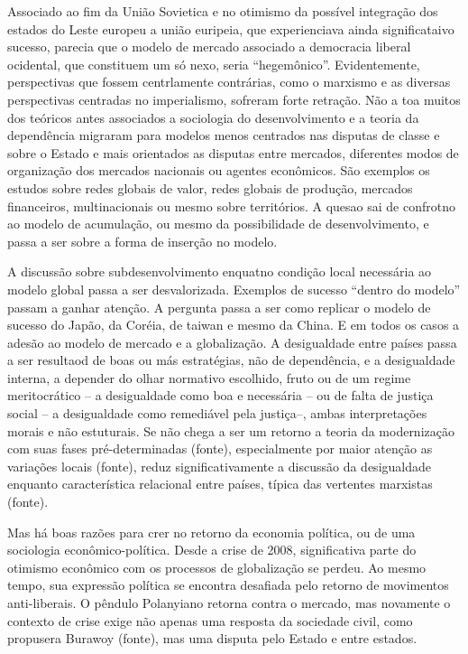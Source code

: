 Associado ao fim da União Sovietica e no otimismo da possível integração dos estados do Leste europeu a união euripeia, que experienciava ainda significataivo sucesso, parecia que o modelo de mercado associado a democracia liberal ocidental, que constituem um só nexo, seria ``hegemônico''. Evidentemente, perspectivas que fossem centrlamente contrárias, como o marxismo e as diversas perspectivas centradas no imperialismo, sofreram forte retração. Não a toa muitos dos teóricos antes associados a sociologia do desenvolvimento e a teoria da dependência migraram para modelos menos centrados nas disputas de classe e sobre o Estado e mais orientados as disputas entre mercados, diferentes modos de organização dos mercados nacionais ou agentes econômicos. São exemplos os estudos sobre redes globais de valor, redes globais de produção, mercados financeiros, multinacionais ou mesmo sobre territórios. A quesao sai de confrotno ao modelo de acumulação, ou mesmo da possibilidade de desenvolvimento, e passa a ser sobre a forma de inserção no modelo.

A discussão sobre subdesenvolvimento enquatno condição local necessária ao modelo global passa a ser desvalorizada. Exemplos de sucesso ``dentro do modelo'' passam a ganhar atenção. A pergunta passa a ser como replicar o modelo de sucesso do Japão, da Coréia, de taiwan e mesmo da China. E em todos os casos a adesão ao modelo de mercado e a globalização. A desigualdade entre países passa a ser resultaod de boas ou más estratégias, não de dependência, e a desigualdade interna, a depender do olhar normativo escolhido, fruto ou de um regime meritocrático -- a desigualdade como boa e necessária -- ou de falta de justiça social -- a desigualdade como remediável pela justiça--, ambas interpretações morais e não estuturais. Se não chega a ser um retorno a teoria da modernização com suas fases pré-determinadas (fonte), especialmente por maior atenção as variações locais (fonte), reduz significativamente a discussão da desigualdade enquanto característica relacional entre países, típica das vertentes marxistas (fonte).

Mas há boas razões para crer no retorno da economia política, ou de uma sociologia econômico-política. Desde a crise de 2008, significativa parte do otimismo econômico com os processos de globalização se perdeu. Ao mesmo tempo, sua expressão política se encontra desafiada pelo retorno de movimentos anti-liberais. O pêndulo Polanyiano retorna contra o mercado, mas novamente o contexto de crise exige não apenas uma resposta da sociedade civil, como propusera Burawoy (fonte), mas uma disputa pelo Estado e entre estados. 

